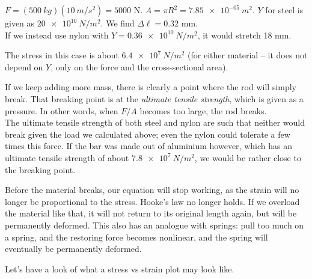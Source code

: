 $F = (\SI{500}{kg})(\SI{10}{m/s^2}) = 5000$ N. $A = \pi R^2 = \SI{7.85e-05}{m^2}$. $Y$ for steel is given as $\SI{20e10}{N/m^2}$. We find $\Delta \ell = 0.32$ mm.\\
If we instead use nylon with $Y = \SI{0.36e10}{N/m^2}$, it would stretch 18 mm.

The stress in this case is about $\SI{6.4e7}{N/m^2}$ (for either material -- it does not depend on $Y$, only on the force and the cross-sectional area).

If we keep adding more mass, there is clearly a point where the rod will simply break. That breaking point is at the \emph{ultimate tensile strength}, which is given as a pressure. In other words, when $F/A$ becomes too large, the rod breaks.\\
The ultimate tensile strength of both steel and nylon are such that neither would break given the load we calculated above; even the nylon could tolerate a few times this force. If the bar was made out of aluminium however, which has an ultimate tensile strength of about $\SI{7.8e7}{N/m^2}$, we would be rather close to the breaking point.

Before the material breaks, our equation will stop working, as the strain will no longer be proportional to the stress. Hooke's law no longer holds. If we overload the material like that, it will not return to its original length again, but will be permanently deformed. This also has an analogue with springs: pull too much on a spring, and the restoring force becomes nonlinear, and the spring will eventually be permanently deformed.

Let's have a look of what a stress vs strain plot may look like.

\begin{figure}[H]
  \centering
{}
\end{figure}


